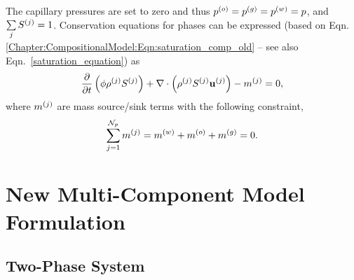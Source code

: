 The capillary pressures are set to zero and thus $\mfr[p]{}{o} = \mfr[p]{}{g} = \mfr[p]{}{w}  = p $, and $\summation_{j}\mfr[S]{}{j} = 1$. Conservation equations for phases can be expressed (based on Eqn. \ref{Chapter:CompositionalModel:Eqn:saturation_comp_old} -- see also Eqn.~\ref{saturation_equation}) as 
   \begin{equation}
       \displaystyle\frac{\partial}{\partial t}\left(\phi\mfr[\rho]{}{j}\mfr[S]{}{j}\right) + \nabla\cdot\left(\mfr[\rho]{}{j}\mfr[S]{}{j}\mfr[\mathbf{u}]{}{j}\right) -\mfr[m]{}{j} = 0, \label{saturation_compositional_1}
   \end{equation}
where $\mfr[m]{}{j}$ are mass source/sink terms with the following constraint,
   \begin{displaymath}
      \summation_{j=1}^{{\cal N}_p} \mfr[m]{}{j}=\mfr[m]{}{w}+\mfr[m]{}{o}+\mfr[m]{}{g}=0. 
   \end{displaymath}

\section{New Multi-Component Model Formulation}\label{Chapter:CompositionalModel:Section:MultiComponentFormulation}

\subsection{Two-Phase System}\label{Chapter:CompositionalModel:Section:MultiComponentFormulation:Section:2PhaseSystem}

